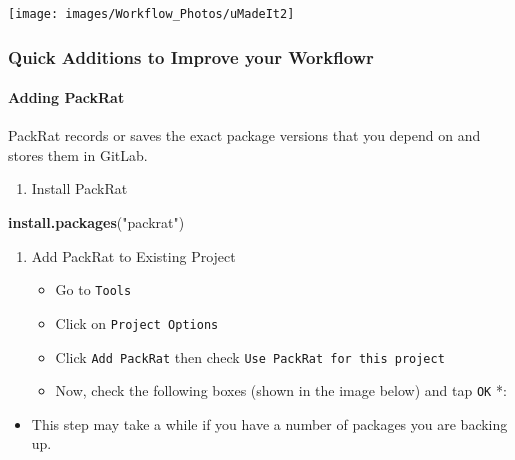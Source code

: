 \documentclass[openany]{article}
\newenvironment{Shaded}{\begin{snugshade}}{\end{snugshade}}
\newcommand{\KeywordTok}[1]{\textcolor[rgb]{0.13,0.29,0.53}{\textbf{#1}}}
\newcommand{\NormalTok}[1]{#1}
\newcommand{\StringTok}[1]{\textcolor[rgb]{0.31,0.60,0.02}{#1}}
\providecommand{\tightlist}{%
  \setlength{\itemsep}{0pt}\setlength{\parskip}{0pt}}
\let\oldparagraph\paragraph
\renewcommand{\paragraph}[1]{\oldparagraph{#1}\mbox{}}
\begin{document}
\begin{center}\texttt{[image: images/Workflow\_Photos/uMadeIt2]} \end{center}

\hypertarget{quick-additions-to-improve-your-workflowr}{%
\subsubsection{Quick Additions to Improve your Workflowr}\label{quick-additions-to-improve-your-workflowr}}

\hypertarget{adding-packrat-1}{%
\paragraph{Adding PackRat}\label{adding-packrat-1}}

PackRat records or saves the exact package versions that you depend on and stores them in GitLab.

\begin{enumerate}
\def\labelenumi{\arabic{enumi}.}
\tightlist
\item
  Install PackRat
\end{enumerate}

\begin{Shaded}
\begin{Highlighting}[]
\KeywordTok{install.packages}\NormalTok{(}\StringTok{"packrat"}\NormalTok{)}
\end{Highlighting}
\end{Shaded}

\begin{enumerate}
\def\labelenumi{\arabic{enumi}.}
\setcounter{enumi}{1}
\item
  Add PackRat to Existing Project

  \begin{itemize}
  \tightlist
  \item
    Go to \texttt{Tools}
  \item
    Click on \texttt{Project\ Options}
  \item
    Click \texttt{Add\ PackRat} then check \texttt{Use\ PackRat\ for\ this\ project}
  \item
    Now, check the following boxes (shown in the image below) and tap \texttt{OK} *:
  \end{itemize}
\end{enumerate}

\begin{itemize}
\tightlist
\item
  This step may take a while if you have a number of packages you are backing up.
\end{itemize}
\end{document}
